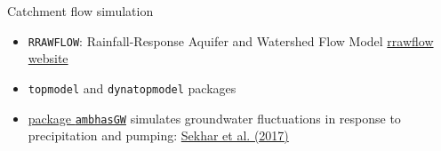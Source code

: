 \documentclass[8pt,ignorenonframetext,]{beamer}
\providecommand{\tightlist}{%
  \setlength{\itemsep}{0pt}\setlength{\parskip}{0pt}}
\newcommand{\columnsend}{\end{columns}}
\begin{document}

\begin{frame}[fragile]{Catchment flow simulation}

\begin{itemize}
\tightlist
\item
  \texttt{RRAWFLOW}: Rainfall-Response Aquifer and Watershed Flow Model
  \href{https://sd.water.usgs.gov/projects/RRAWFLOW/RRAWFLOW.html}{rrawflow
  website}
\item
  \texttt{topmodel} and \texttt{dynatopmodel} packages
\item
  \href{https://cran.r-project.org/package=ambhasGW}{package
  \texttt{ambhasGW}} simulates groundwater fluctuations in response to
  precipitation and pumping:
  \href{www.mdpi.com/2071-1050/10/1/26/pdf}{Sekhar et al. (2017)}
\end{itemize}

\end{frame}
\end{document}
